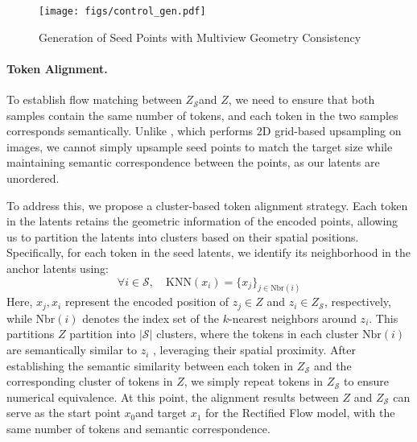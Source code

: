 \begin{figure}
  \texttt{[image: figs/control\_gen.pdf]}
  \caption{
Generation of Seed Points with Multiview Geometry Consistency
  }
  \label{fig:seed_gen}
\end{figure}
\paragraph{Token Alignment.}
To establish flow matching between \( Z_\mathcal{S} \)and \( Z\), we need to ensure that both samples contain the same number of tokens, and each token in the two samples corresponds semantically. Unlike \cite{fischer2023boosting}, which performs 2D grid-based upsampling on images, we cannot simply upsample seed points to match the target size while maintaining semantic correspondence between the points, as our latents are unordered.

To address this, we propose a cluster-based token alignment strategy. Each token in the latents retains the geometric information of the encoded points, allowing us to partition the latents into clusters based on their spatial positions. Specifically, for each token in the seed latents, we identify its neighborhood in the anchor latents using:
\begin{equation}
    \forall i \in \mathcal{S}, \quad \text{KNN}(x_i) = \{x_j\}_{j \in \text{Nbr}(i)}
\end{equation}
Here, \( x_j,x_i\) represent the encoded position of $z_j \in Z$ and $z_i \in Z_\mathcal{S}$, respectively, while $\text{Nbr}(i)$ denotes the index set of the $k$-nearest neighbors around \( z_i\).
This partitions \( Z\) partition into $|\mathcal{S}|$ clusters, where the tokens in  each cluster $\text{Nbr}(i)$ are semantically similar to $z_i$  , leveraging their spatial proximity. 
After establishing the semantic similarity between each token in $Z_\mathcal{S}$ and the corresponding cluster of tokens in $Z$, we simply repeat tokens in $Z_\mathcal{S}$ to ensure numerical equivalence. At this point, the alignment results between \( Z \) and \( Z_\mathcal{S} \) can serve as the start point $x_0 $and target $x_1$ for the Rectified Flow model, with the same number of tokens and semantic correspondence.


